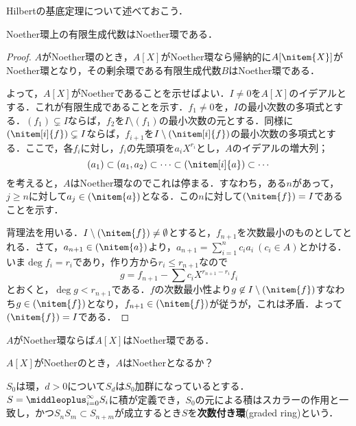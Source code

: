 Hilbertの基底定理について述べておこう．
\begin{thm}[Hilbertの基底定理]\label{thm:Hilbertの基底定理}
	Noether環上の有限生成代数はNoether環である．
\end{thm}
\begin{proof}
	$A$がNoether環のとき，$A[X]$がNoether環なら帰納的に$A[\nitem{X}]$がNoether環となり，その剰余環である有限生成代数$B$はNoether環である．
	
	よって，$A[X]$がNoetherであることを示せばよい．$I\neq0$を$A[X]$のイデアルとする．これが有限生成であることを示す．$f_1\neq0$を，$I$の最小次数の多項式とする．$(f_1)\subsetneq I$ならば，$f_2$を$I\setminus(f_1)$の最小次数の元とする．同様に$(\nitem[i]{f})\subsetneq I$ならば，$f_{i+1}$を$I\setminus(\nitem[i]{f})$の最小次数の多項式とする．ここで，各$f_i$に対し，$f_i$の先頭項を$a_iX^{r_i}$とし，$A$のイデアルの増大列；
	\[(a_1)\subset(a_1,a_2)\subset\dots\subset(\nitem[i]{a})\subset\cdots\]
	を考えると，$A$はNoether環なのでこれは停まる．すなわち，ある$n$があって，$j\geq n$に対して$a_j\in(\nitem{a})$となる．この$n$に対して$(\nitem{f})=I$であることを示す．
	
	背理法を用いる．$I\setminus(\nitem{f})\neq\emptyset$とすると，$f_{n+1}$を次数最小のものとしてとれる．さて，$a_{n+1}\in(\nitem{a})$より，$a_{n+1}=\sum_{i=1}^n c_ia_i~(c_i\in A)$とかける．いま$\deg{f_i}=r_i$であり，作り方から$r_i\leq r_{n+1}$なので
	\[g=f_{n+1}-\sum c_iX^{r_{n+1}-r_i}f_i\]
	とおくと，$\deg g<r_{n+1}$である．$f$の次数最小性より$g\not\in I\setminus(\nitem{f})$すなわち$g\in(\nitem{f})$となり，$f_{n+1}\in(\nitem{f})$が従うが，これは矛盾．よって$(\nitem{f})=I$である．
\end{proof}

\begin{cor}
	$A$がNoether環ならば$A[X]$はNoether環である．
\end{cor}

\begin{exer}
	$A[X]$がNoetherのとき，$A$はNoetherとなるか？
\end{exer}

\begin{defi}[次数付き環]
	$S_0$は環，$d>0$について$S_d$は$S_0$加群になっているとする．$S=\middleoplus_{i=0}^\infty S_i$に積が定義でき，$S_0$の元による積はスカラーの作用と一致し，かつ$S_nS_m\subset S_{n+m}$が成立するとき$S$を\textbf{次数付き環}(graded ring)という．
\end{defi}

